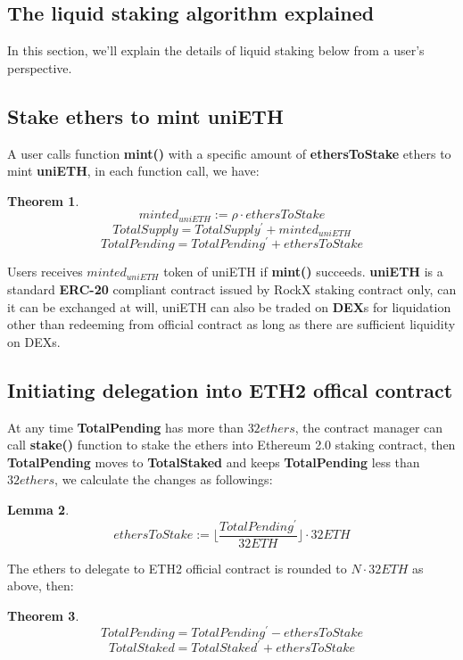 \documentclass{article}
\begin{document}
\newtheorem{theorem}{Theorem}[section]
\newtheorem{corollary}{Corollary}[theorem]
\newtheorem{lemma}[theorem]{Lemma}

\subsection{The liquid staking algorithm explained}
In this section, we'll explain the details of liquid staking below from a user's perspective.

\subsection{Stake ethers to mint uniETH}
A user calls function \textbf{mint()} with a specific amount of \textbf{ethersToStake} ethers to mint \textbf{uniETH}, in each function call, we have:

\begin{theorem}
\label{Mint}
\[minted_{uniETH} := \rho \cdot ethersToStake \]
\[TotalSupply = TotalSupply^{\prime} + minted_{uniETH} \]
\[TotalPending = TotalPending^{\prime} + ethersToStake\]
\end{theorem}

Users receives $minted_{uniETH}$ token of uniETH  if \textbf{mint()} succeeds. \textbf{uniETH} is a standard \textbf{ERC-20} compliant contract issued by RockX staking contract only, can it can be exchanged at will, uniETH can also be traded on \textbf{DEX}s for liquidation other than redeeming from official contract as long as there are sufficient liquidity on DEXs.

\subsection{Initiating delegation into ETH2 offical contract}
At any time \textbf{TotalPending} has more than $32 ethers$, the contract manager can call \textbf{stake()} function to stake the ethers into Ethereum 2.0 staking contract, then \textbf{TotalPending} moves to \textbf{TotalStaked} and keeps \textbf{TotalPending} less than $32 ethers$, we calculate the changes as followings:

\begin{lemma}
\[ethersToStake := \lfloor\frac{TotalPending^{\prime}}{32ETH}\rfloor \cdot 32ETH\]
\end{lemma}

The ethers to delegate to ETH2 official contract is rounded to $N\cdot 32ETH$ as above, then:

\begin{theorem}
\label{Stake}
\[TotalPending = TotalPending^{\prime} - ethersToStake \]
\[TotalStaked = TotalStaked^{\prime} + ethersToStake \]
\end{theorem}
\end{document}
